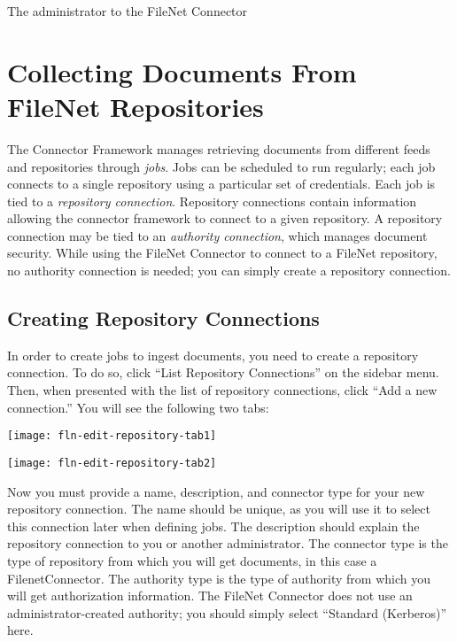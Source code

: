 \begin{changemargin}{1.5in}{0in}
The administrator to the FileNet Connector 

\section{Collecting Documents From FileNet Repositories} %

The Connector Framework manages retrieving documents from different
feeds and repositories through \emph{jobs}. Jobs can be scheduled to
run regularly; each job connects to a single repository using a
particular set of credentials. Each job is tied to a \emph{repository
connection}. Repository connections contain information allowing the
connector framework to connect to a given repository. A repository
connection may be tied to an \emph{authority connection}, which
manages document security. While using the FileNet Connector to
connect to a FileNet repository, no authority connection is needed;
you can simply create a repository connection.


\subsection{Creating Repository Connections}

In order to create jobs to ingest documents, you need to create a
repository connection. To do so, click ``List Repository
Connections'' on the sidebar menu. Then, when presented with the list
of repository connections, click ``Add a new connection.'' You will
see the following two tabs:

\texttt{[image: fln-edit-repository-tab1]}

\texttt{[image: fln-edit-repository-tab2]}







Now you must provide a name, description, and connector type for your
new repository connection. The name should be unique, as you will use
it to select this connection later when defining jobs. The description
should explain the repository connection to you or another
administrator.  The connector type is the type of repository from
which you will get documents, in this case a FilenetConnector. The
authority type is the type of authority from which you will get
authorization information. The FileNet Connector does not use an
administrator-created authority; you should simply select ``Standard
(Kerberos)'' here.


\end{changemargin}
